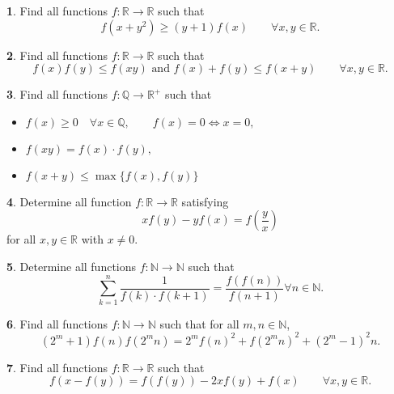 \documentclass{article}
\theoremstyle{definition}
\newtheorem{p}{}
\begin{document}
\begin{p}
Find all functions $ f: \mathbb{R}\to\mathbb{R}$ such that 
\[ f(x+y^2) \geq (y+1)f(x) \qquad \forall x,y \in \mathbb R.\]
\end{p}



\begin{p}
Find all functions $ f: \mathbb{R}\to\mathbb{R}$ such that 
\[ f(x)f(y)\le f(xy) \text{  and  } f(x)+f(y)\le f(x+y) \qquad \forall x,y \in \mathbb R.\]
\end{p}



\begin{p}
Find all functions $f : \mathbb Q \to \mathbb R^+$ such that
\begin{itemize}

\item $f(x) \geq 0 \quad \forall x \in \mathbb Q, \qquad f(x)=0 \iff x=0,$

\item $f(xy)= f(x)\cdot f(y),$

\item $f(x+y) \leq \max \{ f(x), f(y) \}$
\end{itemize}
\end{p}


\begin{p}
Determine all function $f: \mathbb{R} \to \mathbb{R}$ satisfying
\[xf(y)-yf(x)=f(\frac{y}{x})\]
for all $x,y \in \mathbb{R}$ with $x \neq 0$.
\end{p}



\begin{p}
Determine all functions $f:\mathbb{N}\to\mathbb{N}$ such that
\[ \sum_{k=1}^{n}{\frac{1}{f(k)\cdot f(k+1)}}=\frac{f(f(n))}{f(n+1)} \forall n \in \mathbb{N}. \]
\end{p}



\begin{p}
Find all functions $f:\mathbb{N}\to \mathbb{N}$ such that for all $m,n\in\mathbb{N}$,
\[ (2^{m}+1)f(n)f(2^{m}n)=2^{m}f(n)^{2}+f(2^{m}n)^{2}+(2^{m}-1)^{2}n. \]
\end{p}


\begin{p}
Find all functions $ f: \mathbb{R}\to\mathbb{R}$ such that 
\[ f(x-f(y))=f(f(y))-2xf(y)+f(x) \qquad \forall x,y \in \mathbb R.\]
\end{p}
\end{document}
